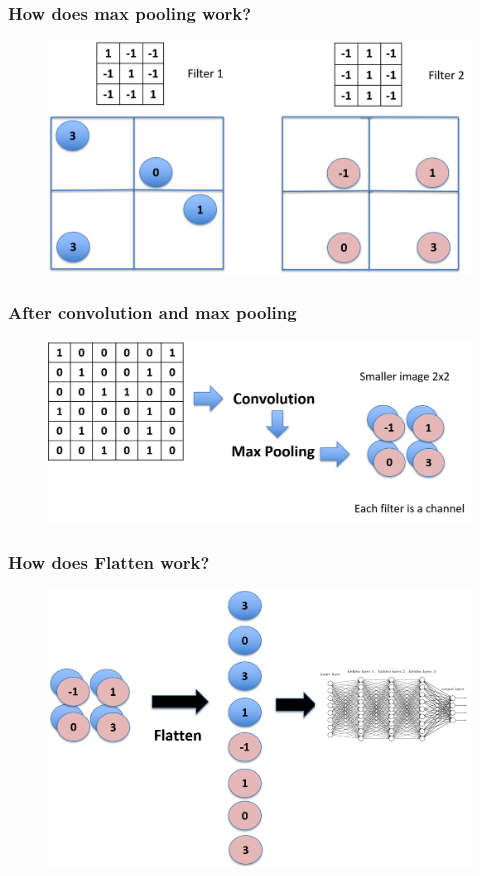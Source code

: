 \documentclass{beamer}
\begin{document}
\begin{frame}
	\frametitle{How does max pooling work?}
	\begin{figure}
	\includegraphics[width=0.8\linewidth]{Picture8}
	\end{figure}
\end{frame}

\begin{frame}
	\frametitle{After convolution and max pooling}
	\begin{figure}
	\includegraphics[width=0.8\linewidth]{Picture9}
	\end{figure}
\end{frame}

\begin{frame}
	\frametitle{How does Flatten work?}
	\begin{figure}
	\includegraphics[width=0.8\linewidth]{Picture10}
	\end{figure}
\end{frame}
\end{document}
